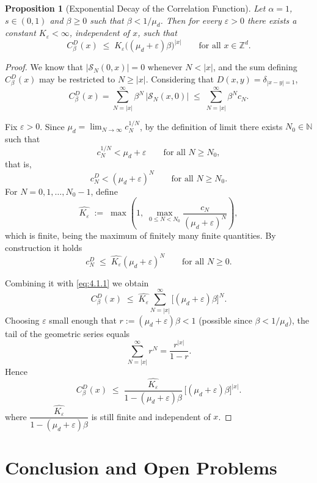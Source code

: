 \documentclass[11pt, a4paper, UKenglish, oneside]{book}
\theoremstyle{plain}
\newtheorem{proposition}[theorem]{Proposition}
\theoremstyle{remark}
\theoremstyle{definition}
\numberwithin{equation}{section}
\numberwithin{theorem}{section}
\begin{document}
\begin{proposition}[Exponential Decay of the Correlation Function]
Let $\alpha=1$, $s \in (0,1)$ and $\beta \ge 0$ such that $\beta < 1/\mu_d$. Then for every $\varepsilon > 0$ there exists a constant $K_\varepsilon < \infty$, independent of $x$, such that
\[
C_\beta^D(x) \;\le\; K_\varepsilon \big( (\mu_d+\varepsilon)\beta \big)^{|x|} \qquad \text{for all } x \in \mathbb{Z}^d.
\]
\end{proposition}

\begin{proof}
We know that $|\mathcal S_N(0,x)| = 0$ whenever $N < |x|$, and the sum defining $C_\beta^D(x)$ may be restricted to $N \ge |x|$. Considering that $D(x,y)=\delta_{|x-y|=1}$,
\begin{equation}
    C_\beta^D(x) = \sum_{N=|x|}^{\infty} \beta^N \, |\mathcal S_N(x,0)| \;\le\; \sum_{N=|x|}^{\infty} \beta^N c_N. \label{eq:4.1.1}
\end{equation}

Fix $\varepsilon > 0$. Since $\mu_d = \lim_{N\to\infty} c_N^{1/N}$, by the definition of limit there exists $N_0  \in \mathbb{N}$ such that
\[
c_N^{1/N} < \mu_d + \varepsilon \qquad \text{for all } N \ge N_0,
\]
that is,
\[
c_N^D< (\mu_d+\varepsilon)^N \qquad \text{for all } N \ge N_0.   
\]
For $N = 0, 1, \dots, N_0-1$, define
\[
\hat{K_\varepsilon} \;:=\; \max\left(1,\; \max_{0 \le N < N_0} \frac{c_N}{(\mu_d+\varepsilon)^N}\right),
\]
which is finite, being the maximum of finitely many finite quantities. By construction it holds
\[
c_N^D\;\le\; \hat{K_\varepsilon} (\mu_d+\varepsilon)^N \qquad \text{for all } N \ge 0.
\]

Combining it with \eqref{eq:4.1.1} we obtain
\[
C_\beta^D(x) \;\le\; \hat{K_\varepsilon} \sum_{N=|x|}^{\infty} \big[(\mu_d+\varepsilon)\beta\big]^N.
\]
Choosing $\varepsilon$ small enough that $r := (\mu_d+\varepsilon)\beta < 1$ (possible since $\beta < 1/\mu_d$), the tail of the geometric series equals
\[
\sum_{N=|x|}^{\infty} r^N = \frac{r^{|x|}}{1-r}.
\]
Hence
\[
C_\beta^D(x) \;\le\; \frac{\hat{K_\varepsilon}}{1-(\mu_d+\varepsilon)\beta} \, \big[(\mu_d+\varepsilon)\beta\big]^{|x|}.
\]
where $ \dfrac{\hat{K_\varepsilon}}{1-(\mu_d+\varepsilon)\beta}$ is still finite and independent of $x$.
\end{proof}




\clearpage
\chapter{Conclusion and Open Problems}
\end{document}
